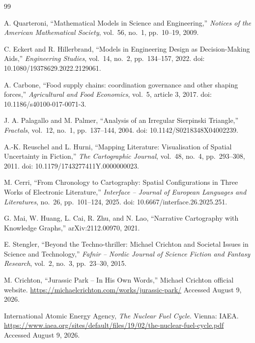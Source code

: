 \documentclass[11pt,a4paper]{article}
\begin{document}
\begin{thebibliography}{99}

A. Quarteroni,
``Mathematical Models in Science and Engineering,''
\emph{Notices of the American Mathematical Society},
vol.~56, no.~1, pp.~10--19, 2009.

C. Eckert and R. Hillerbrand,
``Models in Engineering Design as Decision-Making Aids,''
\emph{Engineering Studies},
vol.~14, no.~2, pp.~134--157, 2022.
doi: 10.1080/19378629.2022.2129061.

A. Carbone,
``Food supply chains: coordination governance and other shaping forces,''
\emph{Agricultural and Food Economics},
vol.~5, article 3, 2017.
doi: 10.1186/s40100-017-0071-3.

J. A. Palagallo and M. Palmer,
``Analysis of an Irregular Sierpinski Triangle,''
\emph{Fractals},
vol.~12, no.~1, pp.~137--144, 2004.
doi: 10.1142/S0218348X04002239.

A.-K. Reuschel and L. Hurni,
``Mapping Literature: Visualisation of Spatial Uncertainty in Fiction,''
\emph{The Cartographic Journal},
vol.~48, no.~4, pp.~293--308, 2011.
doi: 10.1179/1743277411Y.0000000023.

M. Cerri,
``From Chronology to Cartography: Spatial Configurations in Three Works of Electronic Literature,''
\emph{Interface -- Journal of European Languages and Literatures},
no.~26, pp.~101--124, 2025.
doi: 10.6667/interface.26.2025.251.

G. Mai, W. Huang, L. Cai, R. Zhu, and N. Lao,
``Narrative Cartography with Knowledge Graphs,''
arXiv:2112.00970, 2021.

E. Stengler,
``Beyond the Techno-thriller: Michael Crichton and Societal Issues in Science and Technology,''
\emph{Fafnir -- Nordic Journal of Science Fiction and Fantasy Research},
vol.~2, no.~3, pp.~23--30, 2015.

M. Crichton,
``Jurassic Park -- In His Own Words,''
Michael Crichton official website.
\url{https://michaelcrichton.com/works/jurassic-park/}
Accessed August 9, 2026.

International Atomic Energy Agency,
\emph{The Nuclear Fuel Cycle}.
Vienna: IAEA.
\url{https://www.iaea.org/sites/default/files/19/02/the-nuclear-fuel-cycle.pdf}
Accessed August 9, 2026.

\end{thebibliography}
\end{document}
